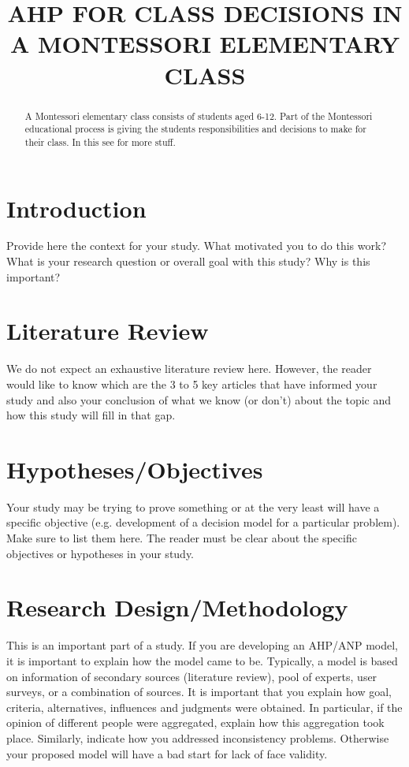 \documentclass[11pt]{article}
\title{AHP FOR CLASS DECISIONS IN A MONTESSORI ELEMENTARY CLASS}
\renewcommand{\maketitle}{\begin{center}{\Large \textbf{\thetitle}} \end{center}}
\begin{document}
\maketitle
\thispagestyle{fancy}
\begin{abstract}
A Montessori elementary class consists of students aged 6-12.  Part of the Montessori educational
process is giving the students responsibilities and decisions to make for their class.  In this see \citep{1:200} for more stuff.
\end{abstract}

\section{Introduction}
Provide here the context for your study. What motivated you to do this work? What is your research question or overall goal with this study? Why is this important? 

\section{Literature Review}
We do not expect an exhaustive literature review here. However, the reader would like to know which are the 3 to 5 key articles that have informed your study and also your conclusion of what we know (or don’t) about the topic and how this study will fill in that gap. 

\section{Hypotheses/Objectives}
Your study may be trying to prove something or at the very least will have a specific objective (e.g. development of a decision model for a particular problem). Make sure to list them here. The reader must be clear about the specific objectives or hypotheses in your study. 

\section{Research Design/Methodology}
This is an important part of a study. If you are developing an AHP/ANP model, it is important to explain how the model came to be. Typically, a model is based on information of secondary sources (literature review), pool of experts, user surveys, or a combination of sources. It is important that you explain how goal, criteria, alternatives, influences and judgments were obtained. In particular, if the opinion of different people were aggregated, explain how this aggregation took place. Similarly, indicate how you addressed inconsistency problems. Otherwise your proposed model will have a bad start for lack of face validity.
\end{document}
